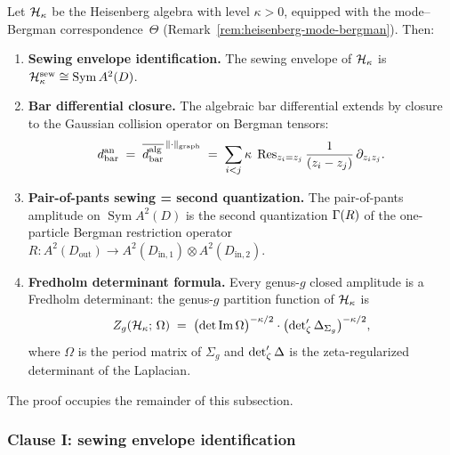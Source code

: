 \begin{theorem}%
\label{thm:thqg-X-heisenberg-sewing-full}%
%
Let $\mathcal{H}_\kappa$ be the Heisenberg algebra with level $\kappa > 0$,
equipped with the mode--Bergman correspondence~$\Theta$
\textup{(}Remark~\textup{\ref{rem:heisenberg-mode-bergman}}\textup{)}.
Then:
\begin{enumerate}[label=\textup{(\Roman*)}]
\item \textbf{Sewing envelope identification.}
 The sewing envelope of $\mathcal{H}_\kappa$ is
 $\mathcal{H}_\kappa^{\mathrm{sew}} \cong
 \operatorname{Sym} A^2(D)$.
\item \textbf{Bar differential closure.}
 The algebraic bar differential extends by closure to the
 Gaussian collision operator on Bergman tensors:
 \begin{equation}\label{eq:thqg-X-bar-closure}
 d_{\mathrm{bar}}^{\mathrm{an}}
 \;=\;
 \overline{d_{\mathrm{bar}}^{\mathrm{alg}}}
 ^{\,\|\cdot\|_{\mathrm{graph}}}
 \;=\;
 \sum_{i < j}
 \kappa\;\operatorname{Res}_{z_i = z_j}
 \frac{1}{(z_i - z_j)}\,
 \partial_{z_i z_j}.
 \end{equation}
\item \textbf{Pair-of-pants sewing = second quantization.}
 The pair-of-pants amplitude on
 $\operatorname{Sym} A^2(D)$ is the second quantization
 $\Gamma(R)$ of the one-particle Bergman restriction
 operator
 $R \colon A^2(D_{\mathrm{out}}) \to
 A^2(D_{\mathrm{in},1}) \otimes A^2(D_{\mathrm{in},2})$.
\item \textbf{Fredholm determinant formula.}
 Every genus-$g$ closed amplitude is a Fredholm determinant:
 the genus-$g$ partition function of $\mathcal{H}_\kappa$ is
 \begin{equation}\label{eq:thqg-X-fredholm-formula}
 Z_g(\mathcal{H}_\kappa;\,\Omega)
 \;=\;
 \bigl(\det\operatorname{Im}\Omega\bigr)^{-\kappa/2}
 \cdot
 \bigl(\det\nolimits'_\zeta\Delta_{\Sigma_g}\bigr)^{-\kappa/2},
 \end{equation}
 where $\Omega$ is the period matrix of $\Sigma_g$ and
 $\det\nolimits'_\zeta\Delta$ is the zeta-regularized determinant of the
 Laplacian.
\end{enumerate}
\end{theorem}

The proof occupies the remainder of this subsection.

\subsubsection{Clause I: sewing envelope identification}

